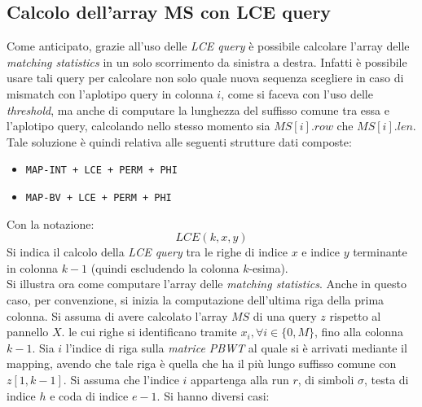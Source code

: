 \subsection{Calcolo dell'array MS con LCE query}
Come anticipato, grazie all'uso delle \textit{LCE query} è possibile calcolare
l'array 
delle \textit{matching statistics} in un solo scorrimento da sinistra a
destra. Infatti è possibile usare tali query per calcolare non solo quale nuova
sequenza scegliere in caso di mismatch con l'aplotipo query in colonna $i$, come
si faceva con l'uso delle \textit{threshold}, ma anche di computare la lunghezza
del suffisso comune tra essa e l'aplotipo query, calcolando nello stesso momento
sia $MS[i].row$ che $MS[i].len$.\\
Tale soluzione è quindi relativa alle seguenti strutture dati composte:
\begin{itemize}
  \item \texttt{MAP-INT + LCE + PERM + PHI}
  \item \texttt{MAP-BV + LCE + PERM + PHI}
\end{itemize}
Con la notazione:
\begin{equation}
  \label{eq:lcecol}
  LCE(k, x, y)
\end{equation}
Si indica il calcolo della \textit{LCE query} tra le righe di indice $x$ e
indice $y$ terminante in colonna $k-1$ (quindi escludendo la colonna
$k$-esima).\\ 
Si illustra ora come computare l'array delle \textit{matching statistics}. Anche
in questo caso, per convenzione, si inizia la computazione dell'ultima 
riga della prima colonna.
Si assuma di avere calcolato l'array $MS$ di una query $z$ rispetto al pannello
$X$. le cui righe si identificano tramite $x_i, \forall i\in\{0,M\}$, fino alla
colonna $k-1$. Sia $i$ 
l'indice di riga sulla \textit{matrice PBWT} al quale si è arrivati mediante il
mapping, avendo che tale riga è quella che ha il più lungo suffisso comune con
$z[1,k-1]$. Si assuma che l'indice $i$ appartenga alla run $r$, di simboli
$\sigma$, testa di indice $h$ e coda di indice $e-1$. Si hanno diversi casi:
